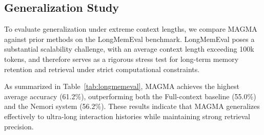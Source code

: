 \documentclass[11pt]{article}
\begin{document}
\begin{table}[t]
\centering
\small
\caption{Performance comparison on LongMemEval dataset across different question types. We compare our MAGMA method against the Full-context baseline and the Nemori system.}
\label{tab:longmemeval}
\end{table}

\subsection{Generalization Study}
\label{sec:rq2}
To evaluate generalization under extreme context lengths, we compare MAGMA against prior methods on the LongMemEval benchmark. LongMemEval poses a substantial scalability challenge, with an average context length exceeding 100k tokens, and therefore serves as a rigorous stress test for long-term memory retention and retrieval under strict computational constraints. 

As summarized in Table~\ref{tab:longmemeval}, MAGMA achieves the highest average accuracy (61.2\%), outperforming both the Full-context baseline (55.0\%) and the Nemori system (56.2\%). These results indicate that MAGMA generalizes effectively to ultra-long interaction histories while maintaining strong retrieval precision.
\end{document}
